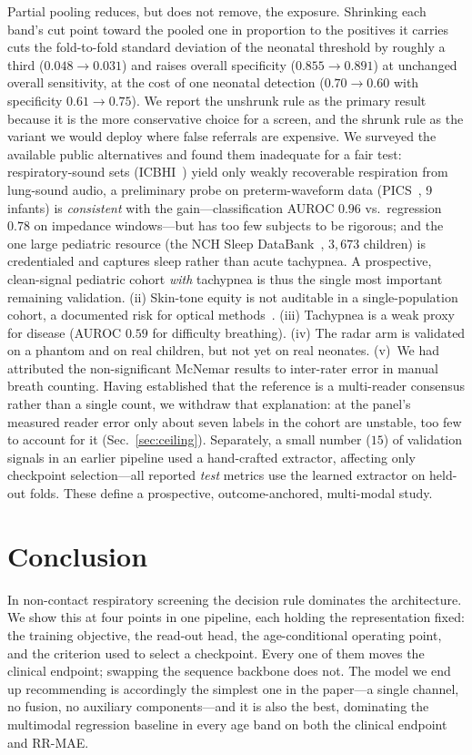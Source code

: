 \documentclass[journal]{IEEEtran}
\begin{document}
Partial pooling reduces, but does not remove, the exposure. Shrinking each band's cut point toward the
pooled one in proportion to the positives it carries cuts the fold-to-fold standard deviation of the
neonatal threshold by roughly a third ($0.048\rightarrow0.031$) and raises overall specificity
($0.855\rightarrow0.891$) at unchanged overall sensitivity, at the cost of one neonatal detection
($0.70\rightarrow0.60$ with specificity $0.61\rightarrow0.75$). We report the unshrunk rule as the
primary result because it is the more conservative choice for a screen, and the shrunk rule as the
variant we would deploy where false referrals are expensive. We surveyed the available public alternatives and found them inadequate for a
fair test: respiratory-sound sets (ICBHI~\cite{icbhi_rocha}) yield only weakly recoverable respiration from lung-sound audio,
a preliminary probe on preterm-waveform data (PICS~\cite{pics}, 9 infants) is \emph{consistent} with the
gain---classification AUROC $0.96$ vs.\ regression $0.78$ on impedance windows---but has too few subjects
to be rigorous; and the one large pediatric resource (the NCH Sleep DataBank~\cite{nchsdb}, $3{,}673$
children) is credentialed and captures sleep rather than acute tachypnea. A prospective, clean-signal pediatric cohort
\emph{with} tachypnea is thus the single most important remaining validation.
(ii) Skin-tone equity is not auditable in a single-population cohort, a documented risk for optical
methods~\cite{nowara_skintone}. (iii) Tachypnea is a weak proxy for disease (AUROC $0.59$ for difficulty
breathing). (iv) The radar arm is validated on a phantom and on real children, but not yet on real
neonates. (v)~We had attributed the non-significant McNemar results to inter-rater error in manual breath
counting. Having established that the reference is a multi-reader consensus rather than a single count,
we withdraw that explanation: at the panel's measured reader error only about seven labels in the cohort
are unstable, too few to account for it (Sec.~\ref{sec:ceiling}). Separately, a small number ($15$) of validation signals in an earlier
pipeline used a hand-crafted extractor, affecting only checkpoint selection---all reported \emph{test}
metrics use the learned extractor on held-out folds. These define a prospective, outcome-anchored,
multi-modal study.

\section{Conclusion}
In non-contact respiratory screening the decision rule dominates the architecture. We show this at four
points in one pipeline, each holding the representation fixed: the training objective, the read-out
head, the age-conditional operating point, and the criterion used to select a checkpoint. Every one of
them moves the clinical endpoint; swapping the sequence backbone does not. The model we end up
recommending is accordingly the simplest one in the paper---a single channel, no fusion, no auxiliary
components---and it is also the best, dominating the multimodal regression baseline in every age band on
both the clinical endpoint and RR-MAE.
\end{document}
